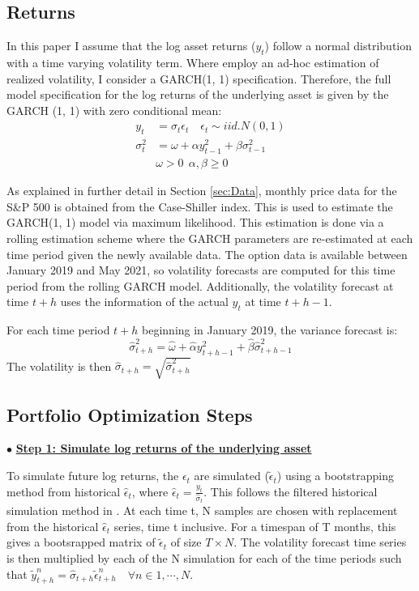 \subsection{Returns}\label{sec:GARCH}

In this paper I assume that the log asset returns ($y_{t}$) follow a normal distribution with a time varying volatility term. Where \cite{faias2017optimal} employ an ad-hoc estimation of realized volatility, I consider a GARCH(1, 1) specification. Therefore, the full model specification for the log returns of the underlying asset is given by the GARCH (1, 1) with zero conditional mean:
\noindent
\begin{align}
\nonumber y_{t} &= \sigma_{t} \epsilon_{t} \quad \epsilon_{t} \sim iid.N(0, 1)
\\ \nonumber \sigma_{t}^{2} &= \omega + \alpha y_{t - 1}^{2} + \beta \sigma_{t - 1}^{2}
\\ \nonumber & \omega > 0 \ \ \alpha, \beta \geq 0
\end{align}

As explained in further detail in Section \ref{sec:Data}, monthly price data for the S\&P 500 is obtained from the Case-Shiller index. This is used to estimate the GARCH(1, 1) model via maximum likelihood. This estimation is done via a rolling estimation scheme where the GARCH parameters are re-estimated at each time period given the newly available data. The option data is available between January 2019 and May 2021, so volatility forecasts are computed for this time period from the rolling GARCH model. Additionally, the volatility forecast at time $t + h$ uses the information of the actual $y_{t}$ at time $t + h - 1$.

For each time period $t + h$ beginning in January 2019, the variance forecast is:
\noindent
\[\hat{\sigma}_{t + h}^{2} = \hat{\omega} + \hat{\alpha} y_{t + h - 1}^{2} + \hat{\beta} \hat{\sigma}_{t + h - 1}^{2}\]
\noindent
The volatility is then $\hat{\sigma}_{t + h} = \sqrt{\hat{\sigma}_{t + h}^{2}}$

\subsection{Portfolio Optimization Steps}\label{sec:OptSteps}
$\bullet$ \underline{\textbf{Step 1: Simulate log returns of the underlying asset}}

To simulate future log returns, the $\epsilon_{t}$ are simulated ($\tilde{\epsilon}_{t}$) using a bootstrapping method from historical $\hat{\epsilon}_{t}$, where $\hat{\epsilon}_{t} = \frac{y_{t}}{\hat{\sigma}_{t}}$. This follows the filtered historical simulation method in \cite{barone2008garch}. At each time t, N samples are chosen with replacement from the historical $\hat{\epsilon}_{t}$ series, time t inclusive. For a timespan of T months, this gives a bootsrapped matrix of $\tilde{\epsilon}_{t}$ of size $T \times N$. The volatility forecast time series is then multiplied by each of the N simulation for each of the time periods such that $\tilde{y}_{t + h}^{n} = \hat{\sigma}_{t + h} \tilde{\epsilon}_{t + h}^{n} \quad \forall n \in 1, \dotsb, N$.


